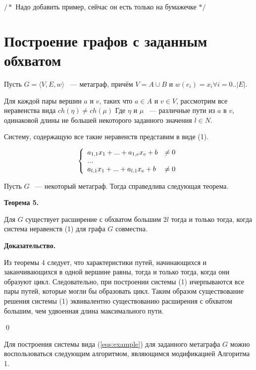 \documentclass[14pt]{mmcs-article}
\begin{document}
$/*$ Надо добавить пример, сейчас он есть только на бумажечке $*/$

\pagebreak
\section*{Построение графов с заданным обхватом}

Пусть $G = \langle V, E, w \rangle$ ~--- метаграф, причём $V = A \cup B$ и $w(e_i) = x_i \forall i = 0..|E|$.

Для каждой пары вершин $a$ и $v$, таких что $a \in A$ и $v \in V$, рассмотрим все неравенства вида $ch(\eta) \neq ch(\mu)$ Где $\eta$ и $\mu$ ~--- различные пути из $a$ в $v$, одинаковой длины не большей некоторого заданного значения $l \in N$.

Систему, содержащую все такие неравенств представим в виде (1).

\begin{equation}
    \centering
    \left\{
        \begin{array}{ll}
            a_{1,1} x_1 + ... + a_{1,e} x_e + b &\neq 0\\
            ...\\
            a_{l,1} x_1 + ... + a_{l,1} x_e + b &\neq 0\\
        \end{array}
    \right.
    \label{eqs:example}
\end{equation}

Пусть $G$ ~--- некоторый метаграф. Тогда справедлива следующая теорема.

\textbf{Теорема 5.}

Для $G$ существует расширение с обхватом большим $2l$  тогда и только тогда, когда система неравенств (1) для графа $G$ совместна.

\textbf{Доказательство.}

Из теоремы 4 следует, что характеристики путей, начинающихся и заканчивающихся в одной вершине равны, тогда и только тогда, когда они образуют цикл. Следовательно, при построении системы (1) ичерпываются все пары путей, которые могли бы образовать цикл. Таким образом существование решения системы (1) эквивалентно существованию расширения с обхватом большим, чем удвоенная длина максимального пути.

\qed

Для построения системы вида (\ref{eqs:example}) для заданного метаграфа $G$ можно воспользоваться следующим алгоритмом, являющимся модификацией Алгоритма 1.
\end{document}
